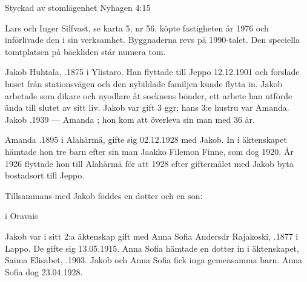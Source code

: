 Styckad av stomlägenhet Nyhagen 4:15

Lars och Inger Silfvast, se karta 5, nr 56, köpte fastigheten år 1976 och införlivade den i sin verksamhet. Byggnaderna revs på 1990-talet. Den speciella tomtplatsen på bäckliden står numera tom.



Jakob Huhtala, .1875 i Ylistaro. Han flyttade till Jeppo 12.12.1901 och forslade huset från stationsvägen och den nybildade familjen kunde flytta in. Jakob  arbetade som dikare och nyodlare åt socknens bönder, ett arbete han utförde ända till slutet av sitt liv. Jakob var gift 3 ggr; hans 3:e hustru var Amanda.
Jakob .1939  ---  Amanda ; hon kom att överleva sin man med 36 år.

Amanda .1895 i Alahärmä, gifte sig 02.12.1928 med Jakob. In i äktenskapet hämtade hon tre barn efter sin man Jaakko Filemon Finne, som dog 1920. År 1926 flyttade hon till Alahärmä för att 1928 efter giftermålet med Jakob byta bostadsort till Jeppo.
\begin{jhchildren}
  \item {}
  \item {}
  \item {}
\end{jhchildren}
Tillsammans med Jakob föddes en dotter och en son:
  \begin{jhchildren}
    \item {} i Oravais
    \item {}
\end{jhchildren}


Jakob var i sitt 2:a äktenskap gift  med Anna Sofia Andersdr Rajakoski, .1877 i Lappo. De gifte sig 13.05.1915. Anna Sofia hämtade en dotter in i äktenskapet, Saima Elisabet, .1903. Jakob och Anna Sofia fick inga gemensamma barn. Anna Sofia dog  23.04.1928.

